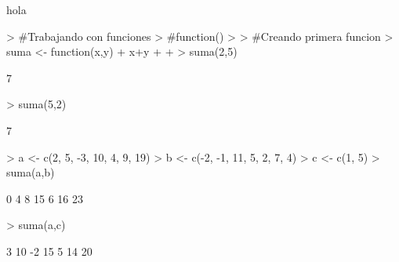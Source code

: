 \documentclass{article}
\begin{document}

hola
\begin{Schunk}
\begin{Sinput}
> #Trabajando con funciones
> #function(){}
> 
> #Creando primera funcion
> suma <- function(x,y){
+   x+y
+   
+ }
> suma(2,5)
\end{Sinput}
\begin{Soutput}
[1] 7
\end{Soutput}
\begin{Sinput}
> suma(5,2)
\end{Sinput}
\begin{Soutput}
[1] 7
\end{Soutput}
\begin{Sinput}
> a <- c(2, 5, -3, 10, 4, 9, 19)
> b <- c(-2, -1, 11, 5, 2, 7, 4)
> c <- c(1, 5)
> suma(a,b)
\end{Sinput}
\begin{Soutput}
[1]  0  4  8 15  6 16 23
\end{Soutput}
\begin{Sinput}
> suma(a,c)
\end{Sinput}
\begin{Soutput}
[1]  3 10 -2 15  5 14 20
\end{Soutput}
\end{Schunk}
\end{document}
